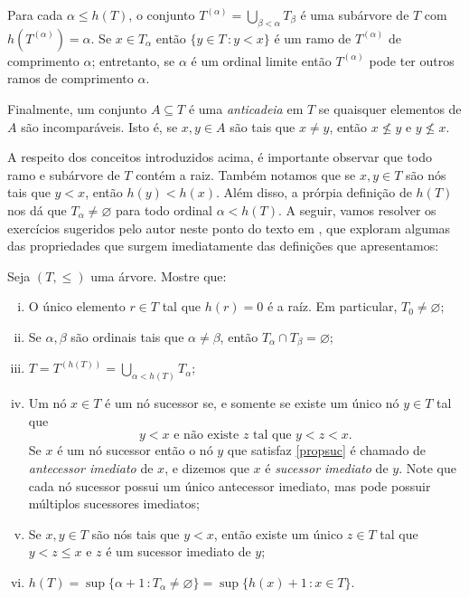\documentclass[a4paper]{article}
\begin{document}
 Para cada \(\alpha\leq h(T)\), o conjunto \(T^{(\alpha)}=\bigcup_{\beta <
   \alpha} T_\beta\) é uma subárvore de \(T\) com  \(h(T^{(\alpha)})=\alpha\).
 Se \(x\in T_\alpha\) então \(\{y\in T\,\colon y < x\}\) é um ramo de \(T^{(\alpha)}\) de
comprimento \(\alpha\); entretanto, se \(\alpha\) é um ordinal limite então
\(T^{(\alpha)}\) pode ter outros ramos de comprimento \(\alpha\).

Finalmente, um conjunto \(A\subseteq T\) é uma \emph{anticadeia} em \(T\) se
quaisquer elementos de \(A\) são incomparáveis. Isto é, se \(x,y\in A\) são tais
que \(x\not = y\), então \(x\not \leq y\) e \(y\not \leq x\).

A respeito dos conceitos introduzidos acima, é importante observar que todo
ramo e subárvore de \(T\) contém a raiz. Também notamos que se \(x,y\in T\)
são nós tais que \(y< x\), então \(h(y) <h(x)\). Além disso, a prórpia definição
de \(h(T)\) nos dá que \(T_\alpha\not=\varnothing\) para todo ordinal
\(\alpha<h(T)\). A seguir, vamos resolver os
exercícios sugeridos pelo autor neste ponto do texto em \cite{jech},
que exploram algumas das propriedades que surgem imediatamente das
definições que apresentamos:

\begin{exercicio}
  Seja \((T,\leq)\) uma árvore. Mostre que:
  \begin{enumerate}[(i)]
  \item O único elemento \(r \in T\) tal que \(h(r)=0\) é a raíz. Em particular,
    \(T_0\not =\varnothing\);
  \item Se \(\alpha,\beta\) são ordinais tais que \(\alpha\not = \beta\), então \(T_\alpha\cap T_\beta =\varnothing\);
  \item \(T=T^{(h(T))}=\bigcup_{\alpha < h(T)}T_\alpha\);
  \item Um nó \(x\in T\) é um nó sucessor se, e somente se existe um único nó \(y\in T\) tal que
    \begin{equation}\label{propsuc}
      y < x \text{ e não existe } z \text{ tal que } y<z<x.
    \end{equation}
    Se \(x\) é um nó sucessor então o nó
    \(y\) que satisfaz \eqref{propsuc}  é chamado de \emph{antecessor imediato} de
    \(x\), e dizemos que \(x\) é \emph{sucessor imediato} de \(y\).
    Note que cada nó sucessor possui um único antecessor imediato,
    mas pode possuir múltiplos sucessores imediatos;
    \item Se \(x,y\in T\) são nós tais que \(y< x\), então existe um único \(z\in T\) tal que \(y< z\leq x\) e
      \(z\) é um sucessor imediato de \(y\);
    \item \(h(T)=\sup\{\alpha +1\,\colon
      T_\alpha\not=\varnothing\}=\sup\{h(x)+1\,\colon x\in T\}.\)
    \end{enumerate}
  \end{exercicio}
  
\end{document}
